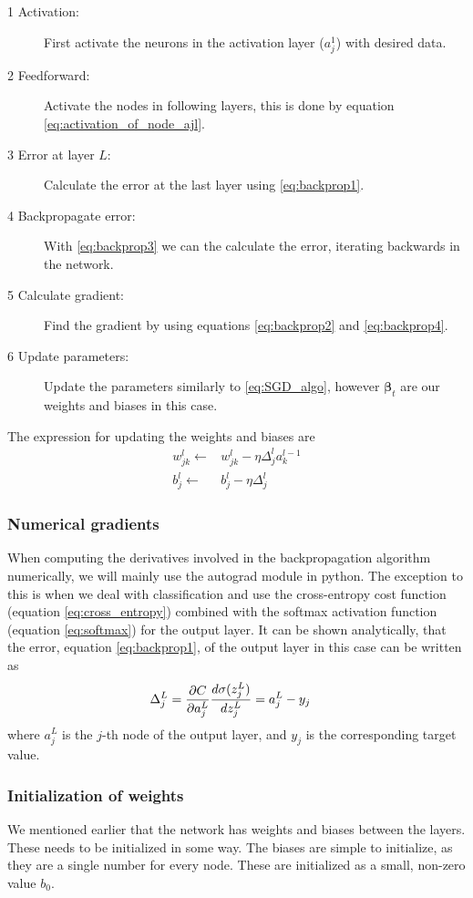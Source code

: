 \documentclass[12pt]{extarticle}
\begin{document}
\begin{description}
	\item[1 Activation:] First activate the neurons in the activation layer ($a^1_j$) with desired data.
	\item[2 Feedforward:] Activate the nodes in following layers, this is done by equation \eqref{eq:activation_of_node_ajl}.
	\item[3 Error at layer $L$:] Calculate the error at the last layer using \eqref{eq:backprop1}.
	\item[4 Backpropagate error:] With \eqref{eq:backprop3} we can the calculate the error, iterating backwards in the network.
	\item[5 Calculate gradient:] Find the gradient by using equations \eqref{eq:backprop2} and \eqref{eq:backprop4}.
	\item[6 Update parameters:] Update the parameters similarly to \eqref{eq:SGD_algo}, however $\boldsymbol{\beta}_t$ are our weights and biases in this case.
\end{description}

The expression for updating the weights and biases are
\begin{align}
	w_{jk}^l \leftarrow & w_{jk}^l - \eta \Delta_j^l a_k^{l-1} \label{eq:update_weights} \\
	b_j^l \leftarrow    & b_j^l - \eta \Delta_j^l \label{eq:update_biases}
\end{align}

\subsubsection{Numerical gradients} \label{sec:num_gradients}
When computing the derivatives involved in the backpropagation algorithm numerically, we will mainly use the autograd module in python. The exception to this is when we deal with classification and use the cross-entropy cost function (equation \eqref{eq:cross_entropy}) combined with the softmax activation function (equation \eqref{eq:softmax}) for the output layer. It can be shown analytically, that the error, equation \eqref{eq:backprop1}, of the output layer in this case can be written as
\begin{align} \label{eq:softmax_crossentropy_derivative}
	\Delta_j^L & = \frac{\partial C}{\partial a_j^L}\frac{d \sigma(z_j^L)}{d z_j^L} = a_j^L - y_j
\end{align}
where $a_j^L$ is the $j$-th node of the output layer, and $y_j$ is the corresponding target value.

\subsubsection{Initialization of weights} \label{sec:wi}
We mentioned earlier that the network has weights and biases between the layers. These needs to be initialized in some way. The biases are simple to initialize, as they are a single number for every node. These are initialized as a small, non-zero value $b_0$.
\end{document}
